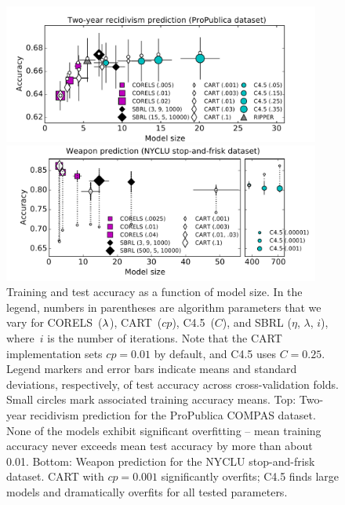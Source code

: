 \begin{figure}[t!]
\begin{center}
\includegraphics[trim={12mm, 0mm, 24mm, 5mm},
width=0.93\textwidth]{figs/compas-sparsity-training.pdf}
\vspace{6mm}

\includegraphics[trim={12mm, 0mm, 24mm, 0mm},
width=0.93\textwidth]{figs/weapon-sparsity-training-c45.pdf}
\end{center}
\caption{Training and test accuracy as a function of model size.
%
In the legend, numbers in parentheses are algorithm parameters that we vary
for CORELS~(${\lambda}$), CART~($cp$), C4.5~($C$), and SBRL ($\eta$, $\lambda$, $i$),
where~$i$ is the number of iterations.
%
Note that the CART implementation sets ${cp = 0.01}$ by default,
and C4.5 uses ${C = 0.25}$.
%
Legend markers and error bars indicate means and standard deviations,
respectively, of test accuracy across cross-validation folds.
%
Small circles mark associated training accuracy means.
%
Top:  Two-year recidivism prediction for the ProPublica COMPAS dataset.
%
%
None of the models exhibit significant overfitting --
mean training accuracy never exceeds mean test accuracy
by more than about 0.01.
%
Bottom:  Weapon prediction for the NYCLU stop-and-frisk dataset.
%
%
CART with ${cp = 0.001}$ significantly overfits;
C4.5 finds large models and dramatically overfits for all tested parameters.
}
\label{fig:sparsity}
\end{figure}

